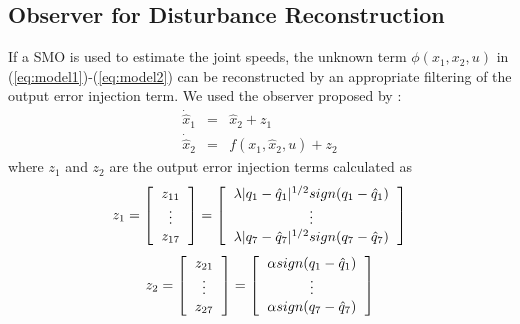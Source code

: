 \documentclass[smallextended]{svjour3}       %
\begin{document}
\subsection{Observer for Disturbance Reconstruction}
If a SMO is used to estimate the joint speeds, the unknown term $\phi(x_1, x_2, u)$ in (\ref{eq:model1})-(\ref{eq:model2}) can be reconstructed by an appropriate filtering of the output error injection term. We used the observer proposed by \cite{shtessel2014sliding}:
  \begin{eqnarray}
    \dot{\hat{x}}_1 &=& \hat{x}_2 + z_1\label{eq:observer1}\\
    \dot{\hat{x}}_2 &=& f(x_1, \hat{x}_2, u) + z_2\label{eq:observer2}
  \end{eqnarray}
  where $z_1$ and $z_2$ are the output error injection terms calculated as
  \begin{equation*}z_1 =
    \left[\begin{tabular}{c}
        $z_{11}$\\
        $\vdots$\\
        $z_{17}$
    \end{tabular}\right] = 
    \left[\begin{tabular}{c}
        $\lambda\vert q_1 - \hat{q}_1\vert ^{1/2}sign(q_1 - \hat{q}_1)$ \\
        $\vdots$\\
        $\lambda\vert q_7 - \hat{q}_7\vert ^{1/2}sign(q_7 - \hat{q}_7)$
    \end{tabular}\right]
\end{equation*}
\begin{equation*}z_2 =
  \left[\begin{tabular}{c}
      $z_{21}$\\
      $\vdots$\\
      $z_{27}$
    \end{tabular}\right] = 
  \left[\begin{tabular}{c}
      $\alpha sign(q_1 - \hat{q}_1)$ \\
      $\vdots$\\
      $\alpha sign(q_7 - \hat{q}_7)$
    \end{tabular}\right]
\end{equation*}
\end{document}
